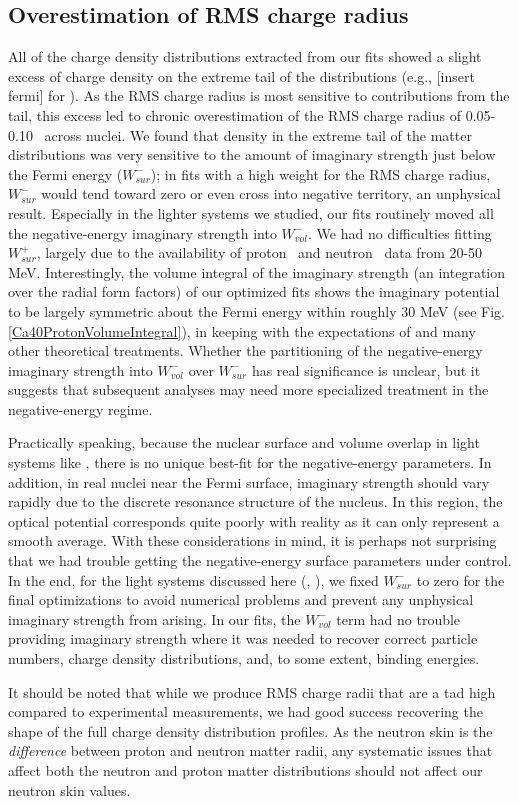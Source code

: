 \subsection{Overestimation of RMS charge radius}
All of the charge density distributions extracted from our fits showed a slight
excess of charge density on the extreme tail of the distributions (e.g., [insert
fermi] for \caForty). As the RMS charge radius is most sensitive to
contributions from the tail, this excess led to chronic overestimation of the RMS
charge radius of 0.05-0.10 \femto\meter\ across nuclei.
We found that density in the extreme tail of the matter distributions was very
sensitive to the amount of imaginary strength just below the Fermi energy
($W_{sur}^{-}$); in fits with a high weight for the RMS charge radius,
$W_{sur}^{-}$ would tend toward zero or even cross into negative territory, an
unphysical result. Especially in the lighter systems we studied, our fits routinely
moved all the negative-energy imaginary strength into $W_{vol}^{-}$.
We had no difficulties fitting $W_{sur}^{+}$, largely due to the
availability of proton \rxn\ and neutron \tot\ data from 20-50 MeV.
Interestingly, the volume
integral of the imaginary strength (an integration over the
radial form factors) of our optimized fits shows the imaginary potential to be largely symmetric
about the Fermi energy within roughly 30 MeV (see Fig. \ref{Ca40ProtonVolumeIntegral}),
in keeping with the expectations of \cite{Mahaux1991} and many other theoretical
treatments. Whether the partitioning
of the negative-energy imaginary strength into $W_{vol}^{-}$ over $W_{sur}^{-}$
has real significance is unclear, but it suggests that subsequent 
analyses may need more specialized treatment in the negative-energy regime.

Practically speaking, because the nuclear surface and volume overlap
in light systems like \oSix, there is no unique best-fit for the
negative-energy parameters. In addition, in real nuclei near the Fermi surface,
imaginary strength should vary rapidly due to the discrete resonance structure of
the nucleus. In this region, the optical potential corresponds quite poorly
with reality as it can only represent a smooth average. With these
considerations in mind, it is perhaps
not surprising that we had trouble getting
the negative-energy surface parameters under control. In the end, for the light systems
discussed here (\oSixEight, \caAughtEight), we fixed $W_{sur}^{-}$ to zero for
the final optimizations to avoid numerical problems and prevent any
unphysical imaginary strength from arising. In our fits, the
$W_{vol}^{-}$ term had no trouble providing imaginary strength where it was
needed to recover correct particle numbers, charge density distributions, and,
to some extent, binding energies.

It should be noted that while we produce RMS charge radii that are a tad high
compared to experimental measurements, we had good success recovering the shape
of the full charge density distribution profiles. As the neutron skin is the
\textit{difference} between proton and neutron matter radii, any systematic
issues that affect both the neutron and proton matter distributions should not
affect our neutron skin values.
\afterpage{\clearpage}
